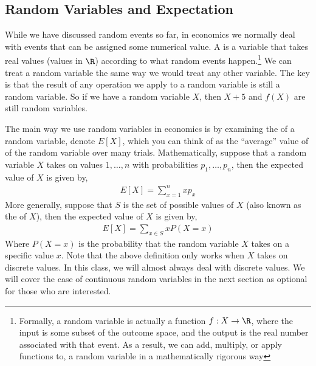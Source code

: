\subsection*{Random Variables and Expectation}
While we have discussed random events so far, in economics we normally deal with events that can be assigned some numerical value. A  is a variable that takes real values (values in $\R$) according to what random events happen.\footnote{
    Formally, a random variable is actually a function $f: X \to \R$, where the input is some subset of the outcome space, and the output is the real number associated with that event. As a result, we can add, multiply, or apply functions to, a random variable in a mathematically rigorous way
} We can treat a random variable the same way we would treat any other variable. The key is that the result of any operation we apply to a random variable is still a random variable. So if we have a random variable $X$, then $X + 5$ and $f(X)$ are still random variables. 

The main way we use random variables in economics is by examining the  of a random variable, denote $E[X]$, which you can think of as the ``average'' value of of the random variable over many trials. Mathematically, suppose that a random variable $X$ takes on values $1, \dots, n$ with probabilities $p_1, \dots, p_n$, then the expected value of $X$ is given by,
\begin{align*}
    E[X] = \sum_{x = 1}^n x p_x
\end{align*}
More generally, suppose that $S$ is the set of possible values of $X$ (also known as the  of $X$), then the expected value of $X$ is given by,
\begin{align*}
    E[X] = \sum_{x \in S} x P(X = x)
\end{align*}
Where $P(X = x)$ is the probability that the random variable $X$ takes on a specific value $x$. Note that the above definition only works when $X$ takes on discrete values. In this class, we will almost always deal with discrete values. We will cover the case of continuous random variables in the next section as optional for those who are interested.  


